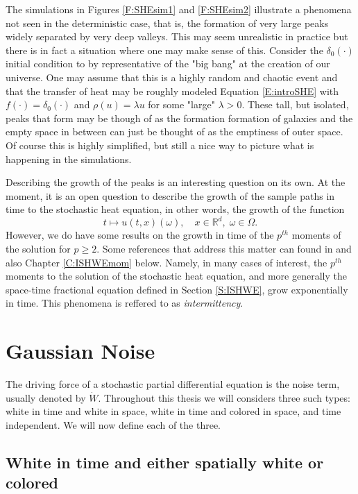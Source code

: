 \documentclass[12pt]{report}
\theoremstyle{plain}
\theoremstyle{definition}
\numberwithin{equation}{section}
\newcommand{\R}{\mathbb{R}}
\begin{document}
The simulations in Figures \ref{F:SHEsim1} and \ref{F:SHEsim2} illustrate a phenomena not seen in the deterministic case, that is, the formation of very large peaks widely separated by very deep valleys. This may seem unrealistic in practice but there is in fact a situation where one may make sense of this. Consider the $\delta_0(\cdot)$ initial condition to by representative of the "big bang" at the creation of our universe. One may assume that this is a highly random and chaotic event and that the transfer of heat may be roughly modeled Equation \eqref{E:introSHE} with $f(\cdot) = \delta_0(\cdot)$ and $\rho(u) = \lambda u$ for some "large" $\lambda > 0$. These tall, but isolated, peaks that form may be though of as the formation formation of galaxies and the empty space in between can just be thought of as the emptiness of outer space. Of course this is highly simplified, but still a nice way to picture what is happening in the simulations. 

Describing the growth of the peaks is an interesting question on its own. At the moment, it is an open question to describe the growth of the sample paths in time to the stochastic heat equation, in other words, the growth of the function
	\[
		t \mapsto u(t,x)(\omega), \quad x \in \R^d, \; \omega \in \Omega.
	\]
However, we do have some results on the growth in time of the $p^{th}$ moments of the solution for $p\ge2$. Some references that address this matter can found in \cite{chen.dalang:15:moments, chen.huang:19:comparison, chen.kim:19:nonlinear} and also Chapter \ref{C:ISHWEmom} below. Namely, in many cases of interest, the $p^{th}$ moments to the solution of the stochastic heat equation, and more generally the space-time fractional equation defined in Section \ref{S:ISHWE}, grow exponentially in time. This phenomena is reffered to as {\em intermittency}.

\section{Gaussian Noise}\label{S:Noise}
The driving force of a stochastic partial differential equation is the noise term, usually denoted by $\dot{W}$. Throughout this thesis we will considers three such types: white in time and white in space, white in time and colored in space, and time independent. We will now define each of the three. 


\subsection{White in time and either spatially white or colored} \label{SS:whitecolor}
\end{document}

